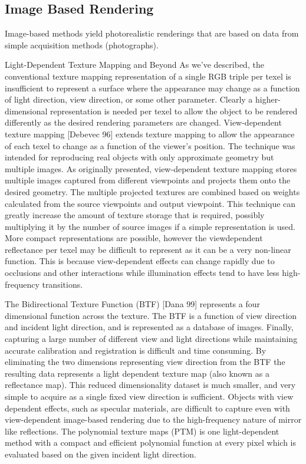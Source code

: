 \subsection{Image Based Rendering}





Image-based methods yield photorealistic renderings that are based on
data from simple acquisition methods (photographs). 

Light-Dependent Texture Mapping and Beyond
As we've described, the conventional texture mapping representation of a single RGB triple per texel is 
insufficient to represent a surface where the appearance may change as a function of light direction, view 
direction, or some other parameter. Clearly a higher-dimensional representation is needed per texel to allow the
object to be rendered differently as the desired rendering parameters are changed. View-dependent texture
mapping [Debevec 96] extends texture mapping to allow the appearance of each texel to change as a function of
the viewer's position. The technique was intended for reproducing real objects with only approximate geometry
but multiple images. As originally presented, view-dependent texture mapping stores multiple images captured 
from different viewpoints and projects them onto the desired geometry. The multiple projected textures are
combined based on weights calculated from the source viewpoints and output viewpoint. This technique can
greatly increase the amount of texture storage that is required, possibly multiplying it by the number of source
images if a simple representation is used. More compact representations are possible, however the viewdependent 
reflectance per texel may be difficult to represent as it can be a very non-linear function. This is
because view-dependent effects can change rapidly due to occlusions and other interactions while illumination
effects tend to have less high-frequency transitions.

The Bidirectional Texture Function (BTF) [Dana 99] represents a four dimensional function across the texture.
The BTF is a function of view direction and incident light direction, and is represented as a database of images.
Finally, capturing a large number of different view
and light directions while maintaining accurate calibration and registration is difficult and time consuming.
By eliminating the two dimensions representing view direction from the BTF the resulting data represents a light
dependent texture map (also known as a reflectance map). This reduced dimensionality dataset is much smaller,
and very simple to acquire as a single fixed view direction is sufficient. Objects with view dependent effects, such as specular materials, are
difficult to capture even with view-dependent image-based rendering due to the high-frequency nature of mirror
like reflections.  The 
polynomial texture maps (PTM) is one light-dependent method with a compact and efficient polynomial function 
at every pixel which is evaluated based on the given incident light direction.






